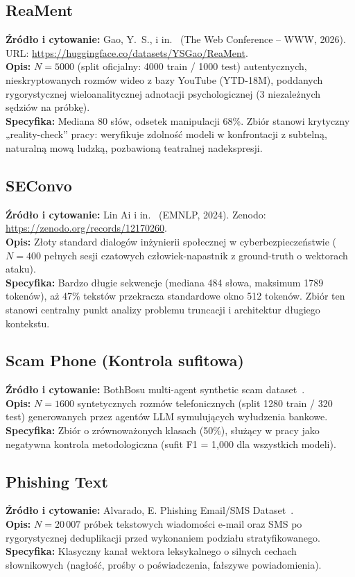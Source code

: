 \documentclass[12pt,a4paper,twoside]{report}
\begin{document}
\subsection{ReaMent}
\textbf{Źródło i cytowanie:} Gao, Y.~S., i in.~\cite{reament2026} (The Web Conference -- WWW, 2026). URL: \url{https://huggingface.co/datasets/YSGao/ReaMent}.\\
\textbf{Opis:} $N = 5000$ (split oficjalny: 4000 train / 1000 test) autentycznych, nieskryptowanych rozmów wideo z bazy YouTube (YTD-18M), poddanych rygorystycznej wieloanalitycznej adnotacji psychologicznej (3 niezależnych sędziów na próbkę).\\
\textbf{Specyfika:} Mediana 80 słów, odsetek manipulacji 68\%. Zbiór stanowi krytyczny „reality-check” pracy: weryfikuje zdolność modeli w konfrontacji z subtelną, naturalną mową ludzką, pozbawioną teatralnej nadekspresji.

\subsection{SEConvo}
\textbf{Źródło i cytowanie:} Lin Ai i in.~\cite{seconvo2024} (EMNLP, 2024). Zenodo: \url{https://zenodo.org/records/12170260}.\\
\textbf{Opis:} Złoty standard dialogów inżynierii społecznej w cyberbezpieczeństwie ($N = 400$ pełnych sesji czatowych człowiek-napastnik z ground-truth o wektorach ataku).\\
\textbf{Specyfika:} Bardzo długie sekwencje (mediana 484 słowa, maksimum 1789 tokenów), aż 47\% tekstów przekracza standardowe okno 512 tokenów. Zbiór ten stanowi centralny punkt analizy problemu truncacji i architektur długiego kontekstu.

\subsection{Scam Phone (Kontrola sufitowa)}
\textbf{Źródło i cytowanie:} BothBosu multi-agent synthetic scam dataset~\cite{bothbosu}.\\
\textbf{Opis:} $N = 1600$ syntetycznych rozmów telefonicznych (split 1280 train / 320 test) generowanych przez agentów LLM symulujących wyłudzenia bankowe.\\
\textbf{Specyfika:} Zbiór o zrównoważonych klasach (50\%), służący w pracy jako negatywna kontrola metodologiczna (sufit F1 = 1,000 dla wszystkich modeli).

\subsection{Phishing Text}
\textbf{Źródło i cytowanie:} Alvarado, E. Phishing Email/SMS Dataset~\cite{ealvaradob}.\\
\textbf{Opis:} $N = 20\,007$ próbek tekstowych wiadomości e-mail oraz SMS po rygorystycznej deduplikacji przed wykonaniem podziału stratyfikowanego.\\
\textbf{Specyfika:} Klasyczny kanał wektora leksykalnego o silnych cechach słownikowych (nagłość, prośby o poświadczenia, fałszywe powiadomienia).
\end{document}
